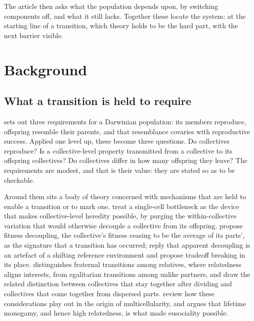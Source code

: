 \documentclass{artificial-life}
\begin{document}
The article then asks what the population depends upon, by switching components
off, and what it still lacks. Together these locate the system: at the starting
line of a transition, which theory holds to be the hard part, with the next
barrier visible.

\section{Background}
\label{sec:related}

\subsection{What a transition is held to require}

\citet{godfreysmith2009} sets out three requirements for a Darwinian
population: its members reproduce, offspring resemble their parents, and that
resemblance covaries with reproductive success. Applied one level up, these
become three questions. Do collectives reproduce? Is a collective-level property
transmitted from a collective to its offspring collectives? Do collectives
differ in how many offspring they leave? The requirements are modest, and that
is their value: they are stated so as to be checkable.

Around them sits a body of theory concerned with mechanisms that are held to
enable a transition or to mark one. \citet{roze2001mutation} treat a single-cell
bottleneck as the device that makes collective-level heredity possible, by
purging the within-collective variation that would otherwise decouple a
collective from its offspring. \citet{michod2003reorganization} propose fitness
decoupling, the collective's fitness ceasing to be the average of its parts', as
the signature that a transition has occurred; \citet{bourrat2022tradeoff} reply
that apparent decoupling is an artefact of a shifting reference environment and
propose tradeoff breaking in its place. \citet{queller1997cooperators}
distinguishes fraternal transitions among relatives, where relatedness aligns
interests, from egalitarian transitions among unlike partners, and
\citet{tarnita2013evolution} draw the related distinction between collectives
that stay together after dividing and collectives that come together from
dispersed parts. \citet{grosberg2007evolution} review how these considerations
play out in the origin of multicellularity, and \citet{boomsma2009lifetime}
argues that lifetime monogamy, and hence high relatedness, is what made
eusociality possible.
\end{document}
